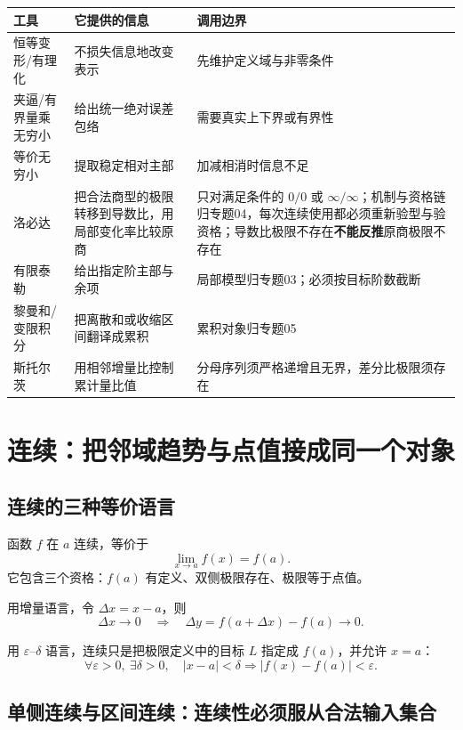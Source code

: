 \documentclass[11pt,a4paper]{ctexart}
\begin{document}
\begin{tabularx}{\linewidth}{L{2.5cm}YY}
\toprule
\textbf{工具} & \textbf{它提供的信息} & \textbf{调用边界}\\
\midrule
恒等变形/有理化 & 不损失信息地改变表示 & 先维护定义域与非零条件\\
夹逼/有界量乘无穷小 & 给出统一绝对误差包络 & 需要真实上下界或有界性\\
等价无穷小 & 提取稳定相对主部 & 加减相消时信息不足\\
洛必达 & 把合法商型的极限转移到导数比，用局部变化率比较原商 & 只对满足条件的 $0/0$ 或 $\infty/\infty$；机制与资格链归专题04，每次连续使用都必须重新验型与验资格；导数比极限不存在\textbf{不能反推}原商极限不存在\\
有限泰勒 & 给出指定阶主部与余项 & 局部模型归专题03；必须按目标阶数截断\\
黎曼和/变限积分 & 把离散和或收缩区间翻译成累积 & 累积对象归专题05\\
斯托尔茨 & 用相邻增量比控制累计量比值 & 分母序列须严格递增且无界，差分比极限须存在\\
\bottomrule
\end{tabularx}

\section{连续：把邻域趋势与点值接成同一个对象}

\subsection{连续的三种等价语言}

函数 $f$ 在 $a$ 连续，等价于
\[
\lim_{x\to a}f(x)=f(a).
\]
它包含三个资格：$f(a)$ 有定义、双侧极限存在、极限等于点值。

用增量语言，令 $\Delta x=x-a$，则
\[
\Delta x\to0\quad\Longrightarrow\quad
\Delta y=f(a+\Delta x)-f(a)\to0.
\]

用 $\varepsilon$--$\delta$ 语言，连续只是把极限定义中的目标 $L$ 指定成 $f(a)$，并允许 $x=a$：
\[
\forall\varepsilon>0,\ \exists\delta>0,
\quad \lvert x-a\rvert<\delta\Longrightarrow \lvert f(x)-f(a)\rvert<\varepsilon.
\]

\subsection{单侧连续与区间连续：连续性必须服从合法输入集合}
\end{document}
